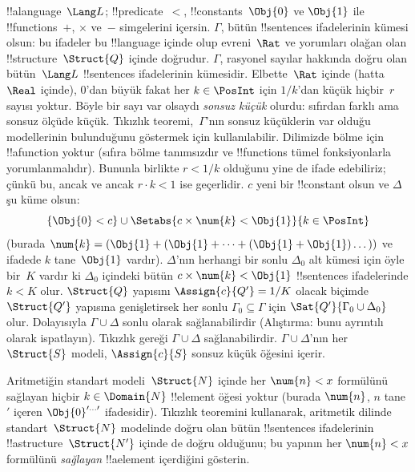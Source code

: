 {\begin{ex}
!!a{language}~$\Lang L$; !!{predicate}~$<$, !!{constant}s~$\Obj{0}$ ve
$\Obj{1}$ ile !!{function}s~$+$, $\times$ ve~$-$ simgelerini içersin.
$\Gamma$, bütün !!{sentence}s ifadelerinin kümesi olsun: bu ifadeler
bu !!{language} içinde olup evreni~$\Rat$ ve yorumları olağan olan
!!{structure}~$\Struct{Q}$ içinde doğrudur. $\Gamma$, rasyonel sayılar
hakkında doğru olan bütün~$\Lang L$ !!{sentence}s ifadelerinin kümesidir.
Elbette~$\Rat$ içinde (hatta~$\Real$ içinde), $0$'dan
büyük fakat her $k\in\PosInt$ için $1/k$'dan küçük hiçbir~$r$ sayısı
yoktur. Böyle bir sayı var olsaydı \emph{sonsuz küçük} olurdu: sıfırdan
farklı ama sonsuz ölçüde küçük. Tıkızlık teoremi,~$\Gamma$'nın sonsuz
küçüklerin var olduğu modellerinin bulunduğunu göstermek için
kullanılabilir. Dilimizde bölme için !!a{function} yoktur (sıfıra bölme
tanımsızdır ve !!{function}s tümel fonksiyonlarla yorumlanmalıdır).
Bununla birlikte $r<1/k$ olduğunu yine de ifade edebiliriz; çünkü bu,
ancak ve ancak $r\cdot k<1$ ise geçerlidir. $c$ yeni bir !!{constant}
olsun ve $\Delta$ şu küme olsun:
\[
\{\Obj{0}<c\}\cup
\Setabs{c\times\num{k}<\Obj{1}}{k\in\PosInt}
\]
(burada $\num{k}=(\Obj{1}+(\Obj{1}+\dots+(\Obj{1}+\Obj{1})\dots))$
ve ifadede $k$ tane~$\Obj{1}$ vardır). $\Delta$'nın herhangi bir sonlu
$\Delta_0$ alt kümesi için öyle bir~$K$ vardır ki $\Delta_0$ içindeki
bütün $c\times\num{k}<\Obj{1}$ !!{sentence}s ifadelerinde $k<K$ olur.
$\Struct{Q}$ yapısını $\Assign{c}{Q'}=1/K$ olacak biçimde
$\Struct{Q'}$ yapısına genişletirsek her sonlu $\Gamma_0\subseteq
\Gamma$ için $\Sat{Q'}{\Gamma_0\cup\Delta_0}$ olur. Dolayısıyla
$\Gamma\cup\Delta$ sonlu olarak sağlanabilirdir (Alıştırma: bunu
ayrıntılı olarak ispatlayın). Tıkızlık gereği $\Gamma\cup\Delta$
sağlanabilirdir. $\Gamma\cup\Delta$'nın her~$\Struct{S}$ modeli,
$\Assign{c}{S}$ sonsuz küçük öğesini içerir.
\end{ex}
}{}

\begin{prob}
Aritmetiğin standart modeli~$\Struct{N}$ içinde her $\num{n}<x$
formülünü sağlayan hiçbir $k\in\Domain{N}$ !!{element} öğesi yoktur
(burada $\num{n}$, $n$ tane $\prime$ içeren
$\Obj{0}^{\prime\dots\prime}$ ifadesidir). Tıkızlık teoremini kullanarak,
aritmetik dilinde standart~$\Struct{N}$ modelinde doğru olan bütün
!!{sentence}s ifadelerinin !!a{structure}~$\Struct{N'}$ içinde de doğru
olduğunu; bu yapının her $\num{n}<x$ formülünü \emph{sağlayan}
!!a{element} içerdiğini gösterin.
\end{prob}
\tagendprob

